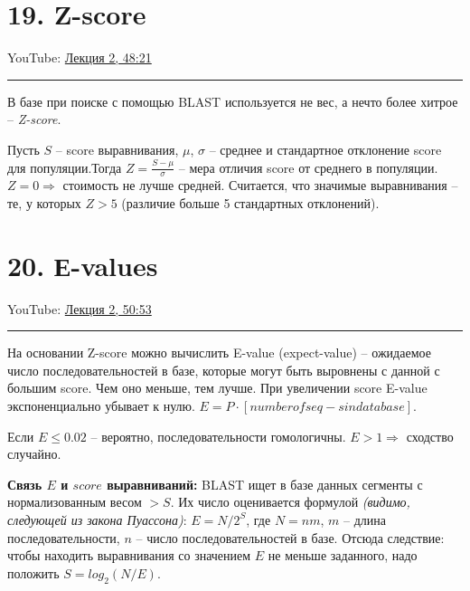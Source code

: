 \documentclass[a4paper,12pt]{article} %
\begin{document}
\newpage
\section{19. Z-score}
YouTube: \href{https://youtu.be/gGoYQBBEX8M?t=2901}{Лекция 2, 48:21}
\hrule \vspace{10pt}
В базе при поиске с помощью BLAST используется не вес, а нечто более хитрое -- \textit{Z-score}.

Пусть $S$ -- score выравнивания, $\mu$, $\sigma$ -- среднее и стандартное отклонение score для популяции.Тогда $Z = \frac{S - \mu}{\sigma}$ -- мера отличия score от среднего в популяции. $Z=0 \Rightarrow$ стоимость не лучше средней. Считается, что значимые выравнивания -- те, у которых $Z > 5$ (различие больше 5 стандартных отклонений).

\section{20. Е-values}
YouTube: \href{https://youtu.be/gGoYQBBEX8M?t=3053}{Лекция 2, 50:53}
\hrule \vspace{10pt}
На основании Z-score можно вычислить E-value (expect-value) -- ожидаемое число последовательностей в базе, которые могут быть выровнены с данной с большим score. Чем оно меньше, тем лучше. При увеличении score E-value экспоненциально убывает к нулю.
$E = P \cdot [number of seq-s in database]$.

Если $E \le 0.02$ -- вероятно, последовательности гомологичны. $E > 1 \Rightarrow$ сходство случайно.

\textbf{Связь $E$ и $score$ выравниваний:} BLAST ищет в базе данных сегменты с нормализованным весом $>S$. Их число оценивается формулой \textit{(видимо, следующей из закона Пуассона)}: $E = N / 2^S$, где $N=nm$, $m$ -- длина последовательности, $n$ -- число последовательностей в базе. Отсюда следствие: чтобы находить выравнивания со значением $E$ не меньше заданного, надо положить $S=log_2(N/E)$.

\newpage
\end{document}
